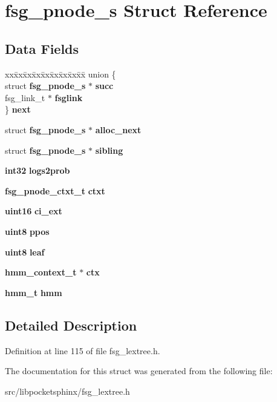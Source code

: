 \section{fsg\-\_\-pnode\-\_\-s \-Struct \-Reference}
\label{structfsg__pnode__s}
\subsection*{\-Data \-Fields}
\begin{DoxyCompactItemize}
\item 
\begin{tabbing}
xx\=xx\=xx\=xx\=xx\=xx\=xx\=xx\=xx\=\kill
union \{\\
\>struct {\bf fsg\_pnode\_s} $\ast$ {\bfseries succ}\\
\>fsg\_link\_t $\ast$ {\bfseries fsglink}\\
\} {\bfseries next}\label{structfsg__pnode__s_a7196e1901e221fae9e6b868cfeecd4b8}
\\

\end{tabbing}\item 
struct {\bf fsg\-\_\-pnode\-\_\-s} $\ast$ {\bfseries alloc\-\_\-next}\label{structfsg__pnode__s_adbea4e213a25b2c89ba594b7d8c54196}

\item 
struct {\bf fsg\-\_\-pnode\-\_\-s} $\ast$ {\bfseries sibling}\label{structfsg__pnode__s_ad1c7c85e434a067aca06676e84b0ad99}

\item 
{\bf int32} {\bfseries logs2prob}\label{structfsg__pnode__s_a2f4fd8578c19663f172d66b63d5a3ab7}

\item 
{\bf fsg\-\_\-pnode\-\_\-ctxt\-\_\-t} {\bfseries ctxt}\label{structfsg__pnode__s_abec388a73d3f027103f4dad6d1489a70}

\item 
{\bf uint16} {\bfseries ci\-\_\-ext}\label{structfsg__pnode__s_a961279d7d814232be14050825571fa25}

\item 
{\bf uint8} {\bfseries ppos}\label{structfsg__pnode__s_a340a46ef9dfecc230cce91d58c7a1001}

\item 
{\bf uint8} {\bfseries leaf}\label{structfsg__pnode__s_a0e14d21465f3c96ae5df22562db52988}

\item 
{\bf hmm\-\_\-context\-\_\-t} $\ast$ {\bfseries ctx}\label{structfsg__pnode__s_a62ddacb58cd22e260f60d6bcef286f6f}

\item 
{\bf hmm\-\_\-t} {\bfseries hmm}\label{structfsg__pnode__s_afc1c0ea784c371c8e916df6ab56d81d1}

\end{DoxyCompactItemize}


\subsection{\-Detailed \-Description}


\-Definition at line 115 of file fsg\-\_\-lextree.\-h.



\-The documentation for this struct was generated from the following file\-:\begin{DoxyCompactItemize}
\item 
src/libpocketsphinx/fsg\-\_\-lextree.\-h\end{DoxyCompactItemize}
